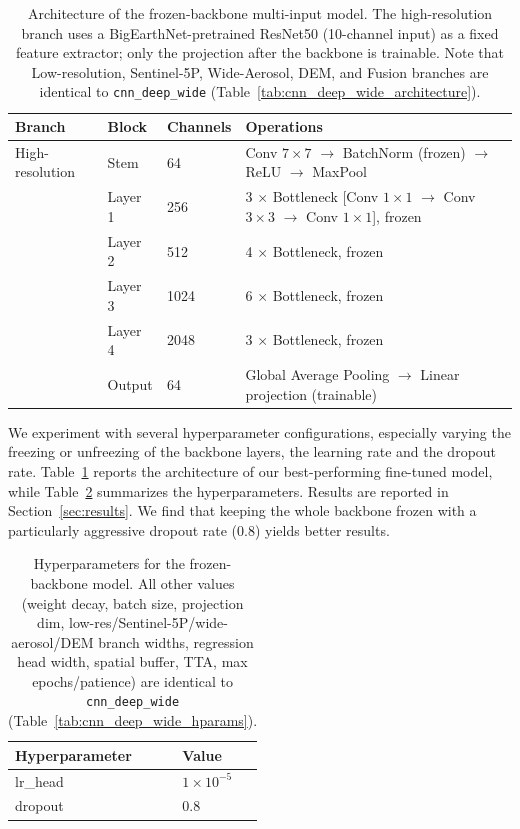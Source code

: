 \documentclass[english, a4paper, numbers=noenddot]{article}
\begin{document}
\begin{table}[h]
\centering
\caption{Architecture of the frozen-backbone multi-input model. The high-resolution branch uses a BigEarthNet-pretrained ResNet50 (10-channel input) as a fixed feature extractor; only the projection after the backbone is trainable. Note that Low-resolution, Sentinel-5P, Wide-Aerosol, DEM, and Fusion branches are identical to \texttt{cnn\_deep\_wide} (Table~\ref{tab:cnn_deep_wide_architecture}).}
\label{tab:resnet_frozen_architecture}
\begin{tabular}{llll}
\hline
\textbf{Branch} & \textbf{Block} & \textbf{Channels} & \textbf{Operations} \\
\hline
High-resolution &
Stem & 64 &
Conv $7\times7$ $\rightarrow$ BatchNorm (frozen) $\rightarrow$ ReLU $\rightarrow$ MaxPool \\
&
Layer 1 & 256 &
3 $\times$ Bottleneck [Conv $1\times1$ $\rightarrow$ Conv $3\times3$ $\rightarrow$ Conv $1\times1$], frozen \\
&
Layer 2 & 512 &
4 $\times$ Bottleneck, frozen \\
&
Layer 3 & 1024 &
6 $\times$ Bottleneck, frozen \\
&
Layer 4 & 2048 &
3 $\times$ Bottleneck, frozen \\
&
Output &
64 &
Global Average Pooling $\rightarrow$ Linear projection (trainable) \\
\hline
\end{tabular}
\end{table}




We experiment with several hyperparameter configurations, especially varying the freezing or unfreezing of the backbone layers, the learning rate and the dropout rate. Table~\ref{tab:resnet_frozen_architecture} reports the architecture of our best-performing fine-tuned model, while Table~\ref{tab:resnet_frozen_hparams} summarizes the hyperparameters. Results are reported in Section~\ref{sec:results}.
 We find that keeping the whole backbone frozen with a particularly aggressive dropout rate (0.8) yields better results. 





\begin{table}[h]
\centering
\caption{Hyperparameters for the frozen-backbone model. All other values (weight decay, batch size, projection dim, low-res/Sentinel-5P/wide-aerosol/DEM branch widths, regression head width, spatial buffer, TTA, max epochs/patience) are identical to \texttt{cnn\_deep\_wide} (Table~\ref{tab:cnn_deep_wide_hparams}).}
\label{tab:resnet_frozen_hparams}
\begin{tabular}{ll}
\hline
\textbf{Hyperparameter} & \textbf{Value} \\
\hline
lr\_head & $1\times10^{-5}$ \\
dropout & 0.8 \\
\hline
\end{tabular}
\end{table}
\end{document}
